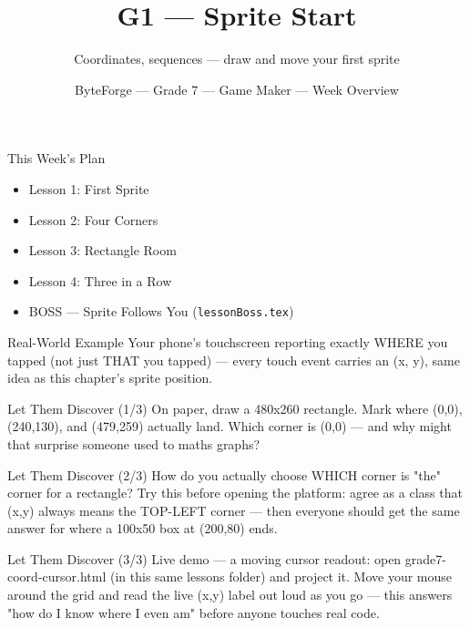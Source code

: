 \documentclass[aspectratio=169]{beamer}
\title{G1 — Sprite Start}
\subtitle{Coordinates, sequences — draw and move your first sprite}
\author{ByteForge --- Grade 7 --- Game Maker --- Week Overview}
\date{}
\begin{document}
\begin{frame}
    \titlepage
\end{frame}

\begin{frame}{This Week's Plan}
    \begin{itemize}
        \item Lesson 1: First Sprite
        \item Lesson 2: Four Corners
        \item Lesson 3: Rectangle Room
        \item Lesson 4: Three in a Row
        \item[$\bigstar$] BOSS --- Sprite Follows You (\texttt{lessonBoss.tex})
    \end{itemize}
\end{frame}

\begin{frame}{Real-World Example}
    \Large
    Your phone's touchscreen reporting exactly WHERE you tapped (not just THAT you tapped) — every touch event carries an (x, y), same idea as this chapter's sprite position.
\end{frame}


\begin{frame}{Let Them Discover (1/3)}
    \Large
    On paper, draw a 480x260 rectangle. Mark where (0,0), (240,130), and (479,259) actually land. Which corner is (0,0) — and why might that surprise someone used to maths graphs?
\end{frame}


\begin{frame}{Let Them Discover (2/3)}
    \Large
    How do you actually choose WHICH corner is "the" corner for a rectangle? Try this before opening the platform: agree as a class that (x,y) always means the TOP-LEFT corner — then everyone should get the same answer for where a 100x50 box at (200,80) ends.
\end{frame}


\begin{frame}{Let Them Discover (3/3)}
    \Large
    Live demo — a moving cursor readout: open grade7-coord-cursor.html (in this same lessons folder) and project it. Move your mouse around the grid and read the live (x,y) label out loud as you go — this answers "how do I know where I even am" before anyone touches real code.
\end{frame}
\end{document}

